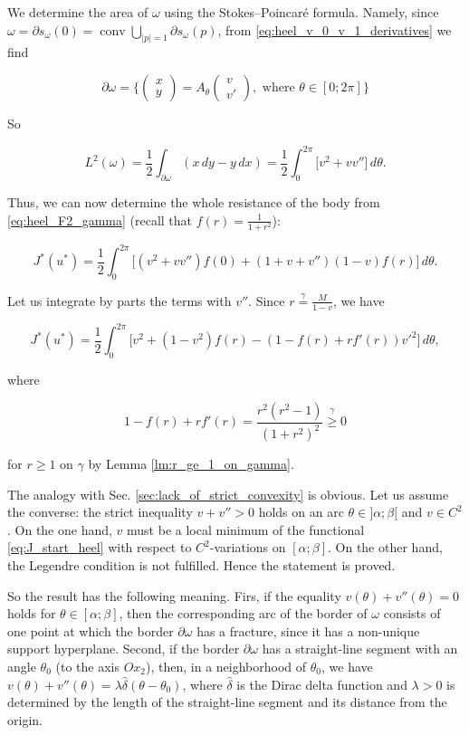 \documentclass[14pt]{extarticle}
\renewcommand{\ge}{\geqslant}
\DeclareMathOperator{\conv}{\mathrm{conv}}
\theoremstyle{remark}
\theoremstyle{definition}
\begin{document}
\noindent We determine the area of $\omega$ using the Stokes--Poincar\'e formula. Namely, since  $\omega=\partial s_\omega(0)=\conv\bigcup_{|p|=1}\partial s_\omega(p)$, from \eqref{eq:heel_v_0_v_1_derivatives} we find

\[
	\partial \omega =\Big\{
	\left(\begin{array}{cc}
		x\\y
	\end{array}\right)=
	A_\theta
	\left(\begin{array}{cc}
		v\\v'
	\end{array}\right),\mbox{ where }\theta\in[0;2\pi]
	\Big\}
\]

\noindent So

\[
	L^2(\omega) = \frac12\int_{\partial\omega}(x\,dy-y\,dx) =
	\frac12\int_0^{2\pi}\big[v^2 + vv''\big]\,d\theta.
\]

Thus, we can now determine the whole resistance of the body from \eqref{eq:heel_F2_gamma} (recall that $f(r)=\frac{1}{1+r^2}$):

\[
	J^*(u^*) = \frac12\int_0^{2\pi}\Big[
		(v^2+vv'')f(0) + (1+v+v'')(1-v)f(r)
	\Big]\,d\theta.
\]

\noindent Let us integrate by parts the terms with $v''$. Since $r\stackrel{\gamma}{=}\frac{M}{1-v}$, we have

\begin{equation}
\label{eq:J_start_heel}
	J^*(u^*) = \frac12\int_0^{2\pi}\Big[
		v^2 + (1-v^2)f(r) - (1-f(r)+rf'(r))v'^2
	\Big]\,d\theta,
\end{equation}

\noindent where

\[
	1-f(r)+rf'(r) = \frac{r^2(r^2-1)}{(1+r^2)^2}\stackrel{\gamma}{\ge}0
\]

\noindent for $r\ge1$ on $\gamma$ by Lemma \ref{lm:r_ge_1_on_gamma}.

The analogy with Sec. \ref{sec:lack_of_strict_convexity} is obvious. Let us assume the converse: the strict inequality $v+v''>0$ holds on an arc $\theta\in]\alpha;\beta[$ and $v\in C^2$. On the one hand, $v$ must be a local minimum of the functional \eqref{eq:J_start_heel} with respect to $C^2$-variations on $[\alpha;\beta]$. On the other hand, the Legendre condition is not fulfilled. Hence the statement is proved.

\medskip

So the result has the following meaning. Firs, if the equality $v(\theta)+v''(\theta)=0$ holds for $\theta\in[\alpha;\beta]$, then the corresponding arc of the border of $\omega$ consists of one point at which the border $\partial\omega$ has a fracture, since it has a non-unique support hyperplane. Second, if the border $\partial\omega$ has a straight-line segment with an angle $\theta_0$ (to the axis $Ox_2$), then, in a neighborhood of $\theta_0$, we have $v(\theta)+v''(\theta) = \lambda\hat\delta(\theta-\theta_0)$, where $\hat\delta$ is the Dirac delta function and $\lambda>0$ is determined by the length of the straight-line segment and its distance from the origin.
\end{document}
